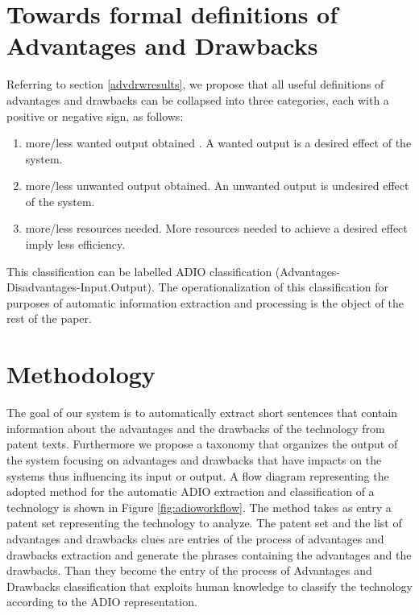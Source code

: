 \documentclass[]{book}
\providecommand{\tightlist}{%
  \setlength{\itemsep}{0pt}\setlength{\parskip}{0pt}}
\begin{document}
\section{Towards formal definitions of Advantages and
Drawbacks}\label{towards-formal-definitions-of-advantages-and-drawbacks}

Referring to section \ref{advdrwresults}, we propose that all useful
definitions of advantages and drawbacks can be collapsed into three
categories, each with a positive or negative sign, as follows:

\begin{enumerate}
\def\labelenumi{\arabic{enumi}.}
\tightlist
\item
  more/less wanted output obtained . A wanted output is a desired effect
  of the system.
\item
  more/less unwanted output obtained. An unwanted output is undesired
  effect of the system.
\item
  more/less resources needed. More resources needed to achieve a desired
  effect imply less efficiency.
\end{enumerate}

This classification can be labelled ADIO classification
(Advantages-Disadvantages-Input.Output). The operationalization of this
classification for purposes of automatic information extraction and
processing is the object of the rest of the paper.

\section{Methodology}\label{methodology-9}

The goal of our system is to automatically extract short sentences that
contain information about the advantages and the drawbacks of the
technology from patent texts. Furthermore we propose a taxonomy that
organizes the output of the system focusing on advantages and drawbacks
that have impacts on the systems thus influencing its input or output. A
flow diagram representing the adopted method for the automatic ADIO
extraction and classification of a technology is shown in Figure
\ref{fig:adioworkflow}. The method takes as entry a patent set
representing the technology to analyze. The patent set and the list of
advantages and drawbacks clues are entries of the process of advantages
and drawbacks extraction and generate the phrases containing the
advantages and the drawbacks. Than they become the entry of the process
of Advantages and Drawbacks classification that exploits human knowledge
to classify the technology according to the ADIO representation.
\end{document}
